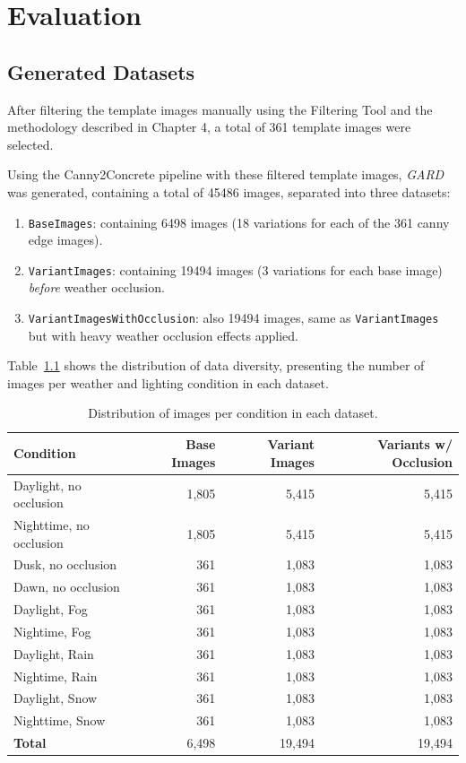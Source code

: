 \chapter{Evaluation}

\section{Generated Datasets}

After filtering the template images manually using the Filtering Tool and
the methodology described in Chapter 4, a total of 361 template images were
selected.

Using the Canny2Concrete pipeline with these filtered template images,
\emph{GARD} was generated, containing a total of 45486 images, separated
into three datasets:

\begin{enumerate}
\item \texttt{BaseImages}: containing 6498 images (18 variations for each of the 361 canny edge images).
\item \texttt{VariantImages}: containing 19494 images (3 variations for each base image) \emph{before} weather occlusion.
\item \texttt{VariantImagesWithOcclusion}: also 19494 images, same as
  \texttt{VariantImages} but with heavy weather occlusion effects applied.
\end{enumerate}

Table~\ref{tab:dataset_distribution} shows the distribution of data diversity,
presenting the number of images per weather and lighting condition in each dataset.

\begin{table}[h]
\centering
\caption{Distribution of images per condition in each dataset.}
\label{tab:dataset_distribution}
\begin{tabular}{|l|r|r|r|}
\hline
\textbf{Condition} & \textbf{Base Images} & \textbf{Variant Images} &
  \textbf{Variants w/ Occlusion} \\
\hline
Daylight, no occlusion     & 1,805 & 5,415 & 5,415 \\
Nighttime, no occlusion    & 1,805 & 5,415 & 5,415 \\
Dusk, no occlusion         & 361   & 1,083 & 1,083 \\
Dawn, no occlusion         & 361   & 1,083 & 1,083 \\
Daylight, Fog              & 361   & 1,083 & 1,083 \\
Nightime, Fog              & 361   & 1,083 & 1,083 \\
Daylight, Rain             & 361   & 1,083 & 1,083 \\
Nightime, Rain             & 361   & 1,083 & 1,083 \\
Daylight, Snow             & 361   & 1,083 & 1,083 \\
Nighttime, Snow            & 361   & 1,083 & 1,083 \\
\hline
\textbf{Total}             & 6,498 & 19,494 & 19,494 \\
\hline
\end{tabular}
\end{table}


